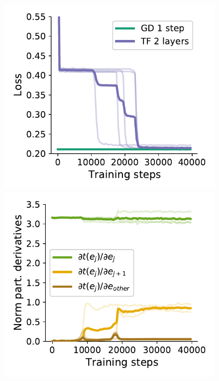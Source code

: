 \documentclass{article}
\theoremstyle{plain}
\theoremstyle{definition}
\theoremstyle{remark}
\begin{document}
\begin{figure}[H]
\vspace{-7pt}
\centering
\hspace{-10pt}
\begin{minipage}{.26\textwidth}
  \centering
  \begin{center}
    \includegraphics[width=1.\textwidth]{Final_figures/copying/train_4.pdf}
  \end{center}
\end{minipage}
\hspace{-15pt}
\begin{minipage}{.26\textwidth}
  \centering
  \begin{center}
    \includegraphics[width=1.\textwidth]{Final_figures/copying/train_3.pdf}

\end{center}
\end{minipage}
\end{figure}
\end{document}
